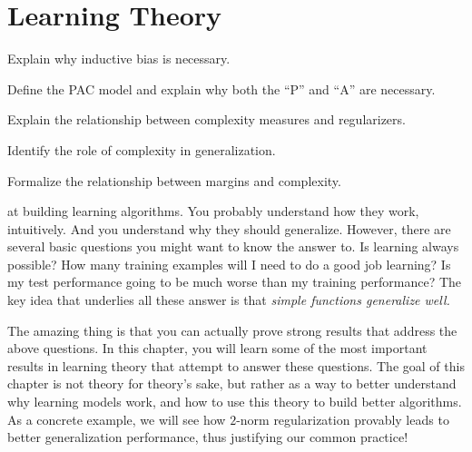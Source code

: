 \chapter{Learning Theory} \label{sec:thy}



\begin{learningobjectives}
\item Explain why inductive bias is necessary.
\item Define the PAC model and explain why both the ``P'' and ``A''
  are necessary.
\item Explain the relationship between complexity measures and
  regularizers.
\item Identify the role of complexity in generalization.
\item Formalize the relationship between margins and complexity.
\end{learningobjectives}

\dependencies{}

 at building learning
algorithms.  You probably understand how they work, intuitively.  And
you understand why they should generalize.  However, there are several
basic questions you might want to know the answer to.  Is learning
always possible?  How many training examples will I need to do a good
job learning?  Is my test performance going to be much worse than my
training performance?  The key idea that underlies all these answer is
that \emph{simple functions generalize well.}

The amazing thing is that you can actually prove strong results that
address the above questions.  In this chapter, you will learn some of
the most important results in learning theory that attempt to answer
these questions.  The goal of this chapter is not theory for theory's
sake, but rather as a way to better understand why learning models
work, and how to use this theory to build better algorithms.  As a
concrete example, we will see how $2$-norm regularization provably
leads to better generalization performance, thus justifying our common
practice!

